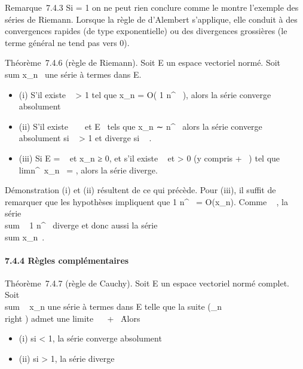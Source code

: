 \documentclass[]{article}
\begin{document}
Remarque~7.4.3 Si \ell = 1 on ne peut rien conclure comme le montre
l'exemple des séries de Riemann. Lorsque la règle de d'Alembert
s'applique, elle conduit à des convergences rapides (de type
exponentielle) ou des divergences grossières (le terme général ne tend
pas vers 0).

Théorème~7.4.6 (règle de Riemann). Soit E un espace vectoriel normé.
Soit \\sum  x_n~
une série à termes dans E.

\begin{itemize}
\itemsep1pt\parskip0pt
\item
  (i) S'il existe \alpha~ > 1 tel que x_n = O( 1
  \over n^\alpha~ ), alors la série converge
  absolument
\item
  (ii) S'il existe \alpha~ \in {}~ et \ell \in E \diagdown\0\
  tels que x_n ∼ \ell \over n^\alpha~
  alors la série converge absolument si \alpha~ > 1 et diverge si
  \alpha~ \leq 1.
\item
  (iii) Si E = ~ et x_n ≥ 0, et s'il existe \alpha~  et \ell
  > 0 (y compris + \infty~) tel que
  limn^\alpha~x_n~ = \ell, alors la
  série diverge.
\end{itemize}

Démonstration (i) et (ii) résultent de ce qui précède. Pour (iii), il
suffit de remarquer que les hypothèses impliquent que  1
\over n^\alpha~ = O(x_n). Comme \alpha~ , la
série \\sum ~  1
\over n^\alpha~ diverge et donc aussi la série
\\sum  x_n~.

\paragraph{7.4.4 Règles complémentaires}

Théorème~7.4.7 (règle de Cauchy). Soit E un espace vectoriel normé
complet. Soit \\sum ~
x_n une série à termes dans E telle que la suite
\left
(\rootn\of\x_n\\right
) admet une limite \ell \in {}~ \cup\ + \infty~\.
Alors

\begin{itemize}
\itemsep1pt\parskip0pt
\item
  (i) si \ell < 1, la série converge absolument
\item
  (ii) si \ell > 1, la série diverge
\end{itemize}
\end{document}
